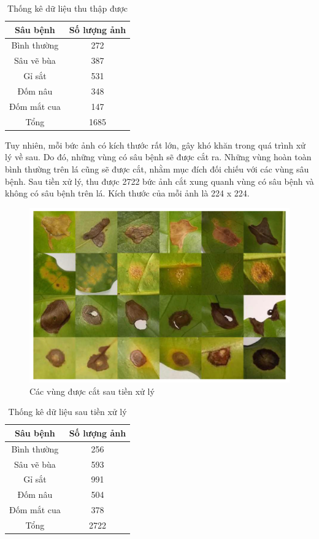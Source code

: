 \documentclass[a4paper,14pt]{extarticle}
\begin{document}
	\begin{table}[H]
		\centering
		\begin{tabular}{|c|c|}
		\hline
		Sâu bệnh    & Số lượng ảnh \\ \hline
		Bình thường & 272          \\
		Sâu vẽ bùa  & 387          \\
		Gỉ sắt      & 531          \\
		Đốm nâu     & 348          \\
		Đốm mắt cua & 147          \\ \hline
		Tổng        & 1685         \\ \hline
		\end{tabular}

		\caption{Thống kê dữ liệu thu thập được}
	\end{table}

	Tuy nhiên, mỗi bức ảnh có kích thước rất lớn, gây khó khăn trong quá trình xử lý về sau. Do đó, những vùng có sâu bệnh sẽ được cắt ra. Những vùng hoàn toàn bình thường trên lá cũng sẽ được cắt, nhằm mục đích đối chiếu với các vùng sâu bệnh. Sau tiền xử lý, thu được 2722 bức ảnh cắt xung quanh vùng có sâu bệnh và không có sâu bệnh trên lá. Kích thước của mỗi ảnh là 224 x 224.
	
	\begin{figure}[H]
		\centering
		\includegraphics[scale=0.3]{images/image3}
		\caption{Các vùng được cắt sau tiền xử lý}
	\end{figure}

	\begin{table}[H]
		\centering
		\begin{tabular}{|c|c|}
		\hline
		Sâu bệnh        & Số lượng ảnh \\ \hline
		Bình thường & 256          \\
		Sâu vẽ bùa  & 593          \\
		Gỉ sắt      & 991          \\
		Đốm nâu     & 504          \\
		Đốm mắt cua & 378          \\ \hline
		Tổng        & 2722         \\ \hline
		\end{tabular}

		\caption{Thống kê dữ liệu sau tiền xử lý}
	\end{table}
\end{document}
